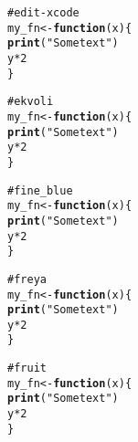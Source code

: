 \documentclass[12pt]{article}\usepackage{graphicx, color}
\makeatletter
\newcommand{\hlfunctioncall}[1]{\textcolor[rgb]{0.188235294117647,0.650980392156863,0.188235294117647}{\textbf{#1}}}%
\newcommand{\hlstring}[1]{\textcolor[rgb]{0.850980392156863,1,0.466666666666667}{#1}}%
\newcommand{\hlcomment}[1]{\textcolor[rgb]{0.533333333333333,0.533333333333333,0.533333333333333}{#1}}%
\newenvironment{kframe}{%
 \def\at@end@of@kframe{}%
 \ifinner\ifhmode%
  \def\at@end@of@kframe{\end{minipage}}%
  \begin{minipage}{\columnwidth}%
 \fi\fi%
 \def\FrameCommand##1{\hskip\@totalleftmargin \hskip-\fboxsep
 \colorbox{shadecolor}{##1}\hskip-\fboxsep
     \hskip-\linewidth \hskip-\@totalleftmargin \hskip\columnwidth}%
 \MakeFramed {\advance\hsize-\width
   \@totalleftmargin\z@ \linewidth\hsize
   \@setminipage}}%
 {\par\unskip\endMakeFramed%
 \at@end@of@kframe}
\newenvironment{knitrout}{}{} %
\makeatother
\begin{document}
\begin{knitrout}
\color{fgcolor}\begin{kframe}
\begin{alltt}
\hlcomment{# edit-xcode}
my_fn <- \hlfunctioncall{function}(x) \{
    \hlfunctioncall{print}(\hlstring{"Some text"})
    y * 2
\}
\end{alltt}
\end{kframe}
\end{knitrout}





\begin{knitrout}
\color{fgcolor}\begin{kframe}
\begin{alltt}
\hlcomment{# ekvoli}
my_fn <- \hlfunctioncall{function}(x) \{
    \hlfunctioncall{print}(\hlstring{"Some text"})
    y * 2
\}
\end{alltt}
\end{kframe}
\end{knitrout}





\begin{knitrout}
\color{fgcolor}\begin{kframe}
\begin{alltt}
\hlcomment{# fine_blue}
my_fn <- \hlfunctioncall{function}(x) \{
    \hlfunctioncall{print}(\hlstring{"Some text"})
    y * 2
\}
\end{alltt}
\end{kframe}
\end{knitrout}





\begin{knitrout}
\color{fgcolor}\begin{kframe}
\begin{alltt}
\hlcomment{# freya}
my_fn <- \hlfunctioncall{function}(x) \{
    \hlfunctioncall{print}(\hlstring{"Some text"})
    y * 2
\}
\end{alltt}
\end{kframe}
\end{knitrout}





\begin{knitrout}
\color{fgcolor}\begin{kframe}
\begin{alltt}
\hlcomment{# fruit}
my_fn <- \hlfunctioncall{function}(x) \{
    \hlfunctioncall{print}(\hlstring{"Some text"})
    y * 2
\}
\end{alltt}
\end{kframe}
\end{knitrout}
\end{document}
